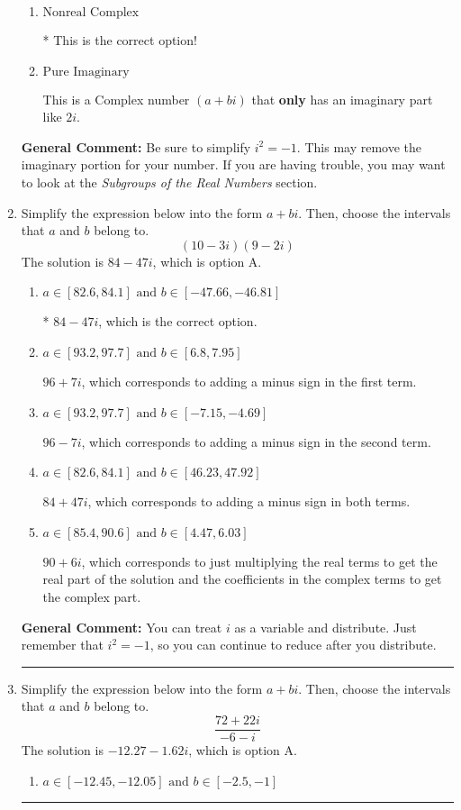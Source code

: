 \documentclass{extbook}[14pt]
\newcommand{\litem}[1]{\item #1

\rule{\textwidth}{0.4pt}}
\begin{document}
\begin{enumerate}
{\begin{enumerate}[label=\Alph*.]
These are numbers that can be written as fraction of Integers (e.g., -2/3 + 5)
\item \( \text{Nonreal Complex} \)

* This is the correct option!
\item \( \text{Pure Imaginary} \)

This is a Complex number $(a+bi)$ that \textbf{only} has an imaginary part like $2i$.
\end{enumerate}

\textbf{General Comment:} Be sure to simplify $i^2 = -1$. This may remove the imaginary portion for your number. If you are having trouble, you may want to look at the \textit{Subgroups of the Real Numbers} section.
}
\litem{
Simplify the expression below into the form $a+bi$. Then, choose the intervals that $a$ and $b$ belong to.
\[ (10 - 3 i)(9 - 2 i) \]The solution is \( 84 - 47 i \), which is option A.\begin{enumerate}[label=\Alph*.]
\item \( a \in [82.6, 84.1] \text{ and } b \in [-47.66, -46.81] \)

* $84 - 47 i$, which is the correct option.
\item \( a \in [93.2, 97.7] \text{ and } b \in [6.8, 7.95] \)

 $96 + 7 i$, which corresponds to adding a minus sign in the first term.
\item \( a \in [93.2, 97.7] \text{ and } b \in [-7.15, -4.69] \)

 $96 - 7 i$, which corresponds to adding a minus sign in the second term.
\item \( a \in [82.6, 84.1] \text{ and } b \in [46.23, 47.92] \)

 $84 + 47 i$, which corresponds to adding a minus sign in both terms.
\item \( a \in [85.4, 90.6] \text{ and } b \in [4.47, 6.03] \)

 $90 + 6 i$, which corresponds to just multiplying the real terms to get the real part of the solution and the coefficients in the complex terms to get the complex part.
\end{enumerate}

\textbf{General Comment:} You can treat $i$ as a variable and distribute. Just remember that $i^2=-1$, so you can continue to reduce after you distribute.
}
\litem{
Simplify the expression below into the form $a+bi$. Then, choose the intervals that $a$ and $b$ belong to.
\[ \frac{72 + 22 i}{-6 - i} \]The solution is \( -12.27  - 1.62 i \), which is option A.\begin{enumerate}[label=\Alph*.]
\item \( a \in [-12.45, -12.05] \text{ and } b \in [-2.5, -1] \)


\end{enumerate}}
\end{enumerate}
\end{document}
